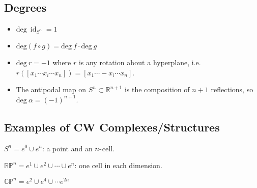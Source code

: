 
\hypertarget{degrees}{%
\subsection{Degrees}\label{degrees}}

\begin{fact}

\envlist

\begin{itemize}
\item
  \(\text{deg}~\operatorname{id}_{S^n} = 1\)
\item
  \(\text{deg} (f\circ g) = \text{deg}~f \cdot \text{deg}~g\)
\item
  \(\text{deg}~r = -1\) where \(r\) is any rotation about a hyperplane,
  i.e.~\(r({\left[ {x_1 \cdots x_i \cdots x_n} \right]}) = {\left[ {x_1 \cdots -x_i \cdots x_n} \right]}\).
\item
  The antipodal map on \(S^n\subset {\mathbb{R}}^{n+1}\) is the
  composition of \(n+1\) reflections, so
  \(\text{deg}~\alpha = (-1)^{n+1}\).
\end{itemize}

\end{fact}

\hypertarget{examples-of-cw-complexesstructures}{%
\subsection{Examples of CW
Complexes/Structures}\label{examples-of-cw-complexesstructures}}

\begin{example}[Spheres]

\(S^n = e^0 \cup e^n\): a point and an \(n{\hbox{-}}\)cell.

\end{example}

\begin{example}

\({\mathbb{RP}}^n = e^1 \cup e^2 \cup \cdots \cup e^n\): one cell in
each dimension.

\end{example}

\begin{example}

\(\mathbb{CP}^n =e^2 \cup e^4 \cup \cdots e^{2n}\)

\end{example}

